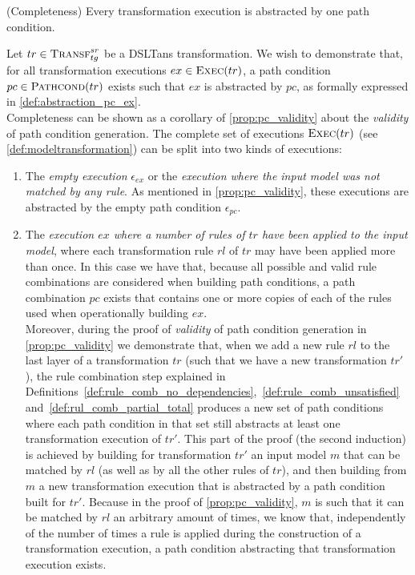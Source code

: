 \begin{proposition}{(Completeness)}
\label{prop:pc_completeness}
Every transformation execution is abstracted by one path condition.
\end{proposition}
\begin{pf}
Let $tr\in \textsc{Transf}^{sr}_{tg}$ be a DSLTans transformation. We wish to demonstrate that, for all transformation executions $ex\in \textsc{Exec}(tr)$, a path condition $pc\in \textsc{Pathcond}(tr)$ exists such that $ex$ is abstracted by $pc$, as formally expressed in \cref{def:abstraction_pc_ex}.\\ 

Completeness can be shown as a corollary of \cref{prop:pc_validity} about the \emph{validity} of path condition generation. The complete set of executions $\textsc{Exec}(tr)$ (see \cref{def:modeltransformation}) can be split into two kinds of executions:
\begin{enumerate}
  \item\label{lab:input_not_matched} The \emph{empty execution} $\epsilon_{ex}$ or the \emph{execution where the input model was not matched by any rule}. As mentioned in \cref{prop:pc_validity}, these executions are abstracted by the empty path condition $\epsilon_{pc}$.\vspace{.3cm}
  \item The \emph{execution $ex$ where a number of rules of $tr$ have been applied to the input model}, where each transformation rule $rl$ of $tr$ may have been applied more than once. In this case we have that, because all possible and valid rule combinations are considered when building path conditions, a path combination $pc$ exists that contains one or more copies of each of the rules used when operationally building $ex$. \\
  
  Moreover, during the proof of \emph{validity} of path condition generation in \cref{prop:pc_validity} we demonstrate that, when we add a new rule $rl$ to the last layer of a transformation $tr$ (such that we have a new transformation $tr'$), the rule combination step explained in Definitions~\ref{def:rule_comb_no_dependencies},~\ref{def:rule_comb_unsatisfied} and~\ref{def:rul_comb_partial_total} produces a new set of path conditions where each path condition in that set still abstracts at least one transformation execution of $tr'$. This part of the proof (the second induction) is achieved by building for transformation $tr'$ an input model $m$ that can be matched by $rl$ (as well as by all the other rules of $tr$), and then building from $m$ a new transformation execution that is abstracted by a path condition built for $tr'$. Because in the proof of \cref{prop:pc_validity}, $m$ is such that it can be matched by $rl$ an arbitrary amount of times, we know that, independently of the number of times a rule is applied during the construction of a transformation execution, a path condition abstracting that transformation execution exists.\\


\end{enumerate}
\end{pf}
